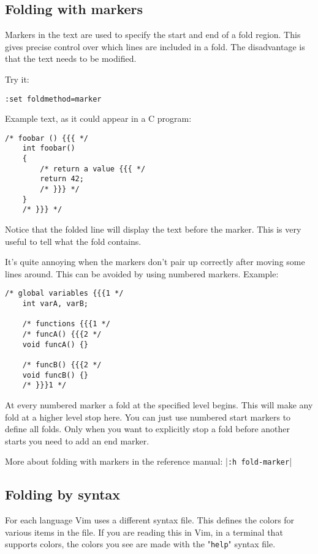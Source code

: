 \subsection{Folding with markers}
Markers in the text are used to specify the start and end of a fold region.
This gives precise control over which lines are included in a fold.
The disadvantage is that the text needs to be modified.

Try it:

\begin{Verbatim}[samepage=true]
 :set foldmethod=marker
\end{Verbatim}

Example text, as it could appear in a C program:

\begin{Verbatim}[samepage=true]
    /* foobar () {{{ */
    int foobar()
    {
        /* return a value {{{ */
        return 42;
        /* }}} */
    }
    /* }}} */
\end{Verbatim}

Notice that the folded line will display the text before the marker.
This is very useful to tell what the fold contains.

It's quite annoying when the markers don't pair up correctly after moving some lines around.
This can be avoided by using numbered markers.
Example:

\begin{Verbatim}[samepage=true]
    /* global variables {{{1 */
    int varA, varB;

    /* functions {{{1 */
    /* funcA() {{{2 */
    void funcA() {}

    /* funcB() {{{2 */
    void funcB() {}
    /* }}}1 */
\end{Verbatim}

At every numbered marker a fold at the specified level begins.
This will make any fold at a higher level stop here.
You can just use numbered start markers to define all folds.
Only when you want to explicitly stop a fold before another starts you need to add an end marker.

More about folding with markers in the reference manual: |\verb!:h fold-marker!|
\subsection{Folding by syntax}
For each language Vim uses a different syntax file.
This defines the colors for various items in the file.
If you are reading this in Vim, in a terminal that supports colors, the colors you see are made with the "\verb!help!" syntax file.

